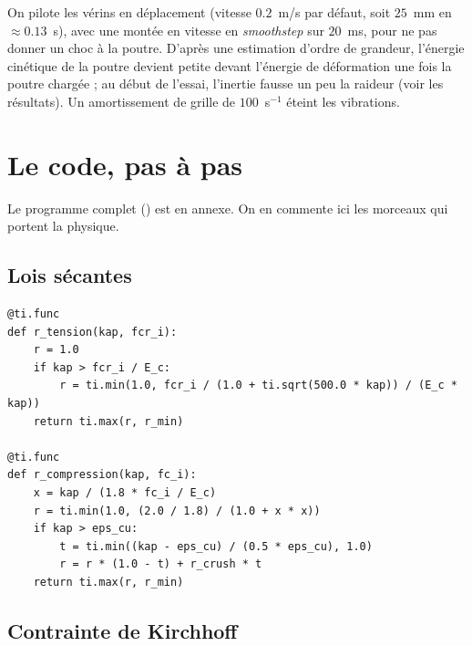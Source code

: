 \documentclass[11pt,a4paper]{article}
\newcommand{\code}[1]{\texttt{\detokenize{#1}}}
\begin{document}
On pilote les vérins en déplacement (vitesse $0.2$~m/s par défaut, soit $25$~mm en $\approx0.13$~s),
avec une montée en vitesse en \emph{smoothstep} sur $20$~ms, pour ne pas donner un choc à la poutre.
D'après une estimation d'ordre de grandeur, l'énergie cinétique de la poutre devient petite devant
l'énergie de déformation une fois la poutre chargée ; au début de l'essai, l'inertie fausse un peu la
raideur (voir les résultats). Un
amortissement de grille de $100$~s$^{-1}$ éteint les vibrations.

\section{Le code, pas à pas}

Le programme complet (\code{MpM/beton.py}) est en annexe. On en commente ici les morceaux
qui portent la physique.

\subsection{Lois sécantes}

\begin{lstlisting}
@ti.func
def r_tension(kap, fcr_i):
    r = 1.0
    if kap > fcr_i / E_c:
        r = ti.min(1.0, fcr_i / (1.0 + ti.sqrt(500.0 * kap)) / (E_c * kap))
    return ti.max(r, r_min)

@ti.func
def r_compression(kap, fc_i):
    x = kap / (1.8 * fc_i / E_c)
    r = ti.min(1.0, (2.0 / 1.8) / (1.0 + x * x))
    if kap > eps_cu:
        t = ti.min((kap - eps_cu) / (0.5 * eps_cu), 1.0)
        r = r * (1.0 - t) + r_crush * t
    return ti.max(r, r_min)
\end{lstlisting}

\subsection{Contrainte de Kirchhoff}
\end{document}
